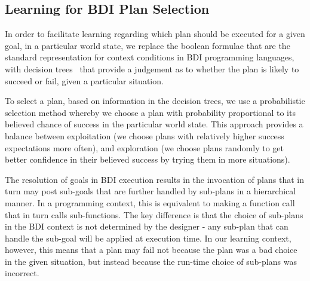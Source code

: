 \subsection{Learning for BDI Plan Selection} \label{subsec:bdi_learning}
In order to facilitate learning regarding which plan should be
executed for a given goal, in a particular world state, we replace the
boolean formulae that are the standard representation for context
conditions in BDI programming languages, with decision
trees~\cite{Mitchell97:ML} that provide a judgement as to whether the
plan is likely to succeed or fail, given a particular situation. 

To select a plan, based on information in the decision trees, we use a
probabilistic selection method whereby we choose a plan with
probability proportional to its believed chance of success in the
particular world state. This approach provides a balance between
exploitation (we choose plans with relatively higher success expectations
more often), and exploration (we choose plans randomly to get better
confidence in their believed success by trying them in more 
situations).

The resolution of goals in BDI execution results in 
the invocation of plans that in turn may post sub-goals that are further
handled by sub-plans in a hierarchical manner. In a programming context,
this is equivalent to making a function call that in turn calls sub-functions.
The key difference is that the choice of sub-plans in the BDI context is
not determined by the designer - any sub-plan that can handle 
the sub-goal will be applied at execution time. In our learning context, however,
this means that a plan may fail not because the plan was a bad choice in the
given situation, but instead because the run-time choice of sub-plans was
incorrect. 


